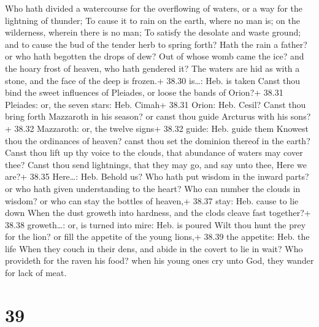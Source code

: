 Who hath divided a watercourse for the overflowing of
waters, or a way for the lightning of thunder;  To cause it
to rain on the earth, where no man is; on the wilderness, wherein there
is no man;  To satisfy the desolate and waste ground; and
to cause the bud of the tender herb to spring forth?  Hath
the rain a father? or who hath begotten the drops of dew? 
Out of whose womb came the ice? and the hoary frost of heaven, who hath
gendered it?  The waters are hid as with a stone, and the
face of the deep is frozen.+ 38.30 is\ldots: Heb. is taken 
Canst thou bind the sweet influences of Pleiades, or loose the bands of
Orion?+ 38.31 Pleiades: or, the seven stars: Heb. Cimah+ 38.31 Orion:
Heb. Cesil?  Canst thou bring forth Mazzaroth in his
season? or canst thou guide Arcturus with his sons?+ 38.32 Mazzaroth:
or, the twelve signs+ 38.32 guide: Heb. guide them  Knowest
thou the ordinances of heaven? canst thou set the dominion thereof in
the earth?  Canst thou lift up thy voice to the clouds,
that abundance of waters may cover thee?  Canst thou send
lightnings, that they may go, and say unto thee, Here we are?+ 38.35
Here\ldots: Heb. Behold us?  Who hath put wisdom in the
inward parts? or who hath given understanding to the heart?
 Who can number the clouds in wisdom? or who can stay the
bottles of heaven,+ 38.37 stay: Heb. cause to lie down 
When the dust groweth into hardness, and the clods cleave fast
together?+ 38.38 groweth\ldots: or, is turned into mire: Heb. is poured
 Wilt thou hunt the prey for the lion? or fill the appetite
of the young lions,+ 38.39 the appetite: Heb. the life 
When they couch in their dens, and abide in the covert to lie in wait?
 Who provideth for the raven his food? when his young ones
cry unto God, they wander for lack of meat.

\hypertarget{section-38}{%
\section{39}\label{section-38}}

